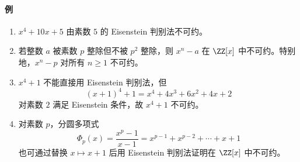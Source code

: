 \paragraph{例}
\begin{enumerate}[label=(\arabic*)]
	\item $x^4+10x+5$ 由素数 $5$ 的 Eisenstein 判别法不可约。
	\item 若整数 $a$ 被素数 $p$ 整除但不被 $p^2$ 整除，则 $x^n-a$ 在 $\ZZ[x]$ 中不可约。特别地，$x^n-p$ 对所有 $n\geq1$ 不可约。
	\item $x^4+1$ 不能直接用 Eisenstein 判别法，但
	\[
	(x+1)^4+1=x^4+4x^3+6x^2+4x+2
	\]
	对素数 $2$ 满足 Eisenstein 条件，故 $x^4+1$ 不可约。
	\item 对素数 $p$，分圆多项式
	\[
	\Phi_p(x)=\frac{x^p-1}{x-1}=x^{p-1}+x^{p-2}+\cdots+x+1
	\]
	也可通过替换 $x\mapsto x+1$ 后用 Eisenstein 判别法证明在 $\ZZ[x]$ 中不可约。
\end{enumerate}



